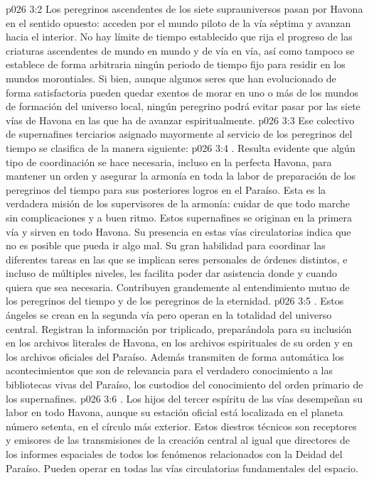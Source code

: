\vs p026 3:2 Los peregrinos ascendentes de los siete suprauniversos pasan por Havona en el sentido opuesto: acceden por el mundo piloto de la vía séptima y avanzan hacia el interior. No hay límite de tiempo establecido que rija el progreso de las criaturas ascendentes de mundo en mundo y de vía en vía, así como tampoco se establece de forma arbitraria ningún periodo de tiempo fijo para residir en los mundos morontiales. Si bien, aunque algunos seres que han evolucionado de forma satisfactoria pueden quedar exentos de morar en uno o más de los mundos de formación del universo local, ningún peregrino podrá evitar pasar por las siete vías de Havona en las que ha de avanzar espiritualmente.
\vs p026 3:3 \pc Ese colectivo de supernafines terciarios asignado mayormente al servicio de los peregrinos del tiempo se clasifica de la manera siguiente:
\vs p026 3:4 . Resulta evidente que algún tipo de coordinación se hace necesaria, incluso en la perfecta Havona, para mantener un orden y asegurar la armonía en toda la labor de preparación de los peregrinos del tiempo para sus posteriores logros en el Paraíso. Esta es la verdadera misión de los supervisores de la armonía: cuidar de que todo marche sin complicaciones y a buen ritmo. Estos supernafines se originan en la primera vía y sirven en todo Havona. Su presencia en estas vías circulatorias indica que no es posible que pueda ir algo mal. Su gran habilidad para coordinar las diferentes tareas en las que se implican seres personales de órdenes distintos, e incluso de múltiples niveles, les facilita poder dar asistencia donde y cuando quiera que sea necesaria. Contribuyen grandemente al entendimiento mutuo de los peregrinos del tiempo y de los peregrinos de la eternidad.
\vs p026 3:5 . Estos ángeles se crean en la segunda vía pero operan en la totalidad del universo central. Registran la información por triplicado, preparándola para su inclusión en los archivos literales de Havona, en los archivos espirituales de su orden y en los archivos oficiales del Paraíso. Además transmiten de forma automática los acontecimientos que son de relevancia para el verdadero conocimiento a las bibliotecas vivas del Paraíso, los custodios del conocimiento del orden primario de los supernafines.
\vs p026 3:6 . Los hijos del tercer espíritu de las vías desempeñan su labor en todo Havona, aunque su estación oficial está localizada en el planeta número setenta, en el círculo más exterior. Estos diestros técnicos son receptores y emisores de las transmisiones de la creación central al igual que directores de los informes espaciales de todos los fenómenos relacionados con la Deidad del Paraíso. Pueden operar en todas las vías circulatorias fundamentales del espacio.
